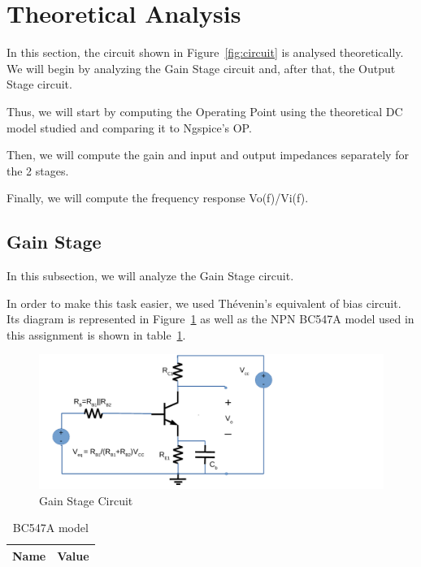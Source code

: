 \section{Theoretical Analysis}
\label{sec:analysis}
In this section, the circuit shown in Figure~\ref{fig:circuit} is analysed
theoretically. We will begin by analyzing the Gain Stage circuit and, after that, the Output Stage circuit.

Thus, we will start by computing the Operating Point using the theoretical DC
model studied and comparing it to Ngspice’s OP.

Then, we will compute the gain and input and output impedances separately for the 2 stages. 

Finally, we will compute the frequency response Vo(f)/Vi(f).

\subsection{Gain Stage}
In this subsection, we will analyze the Gain Stage circuit.

In order to make this task easier, we used Thévenin's equivalent of bias circuit. Its diagram is represented in Figure~\ref{fig:gscircuit} as well as the NPN BC547A model used in this assignment is shown in table~\ref{tab:bgs}.

\begin{figure}[H] \centering
\includegraphics[width=0.8\linewidth]{gainstage.pdf}
\caption{Gain Stage Circuit}                                     %
\label{fig:gscircuit}
\end{figure}


\begin{table}[H]
  \centering
  \begin{tabular}{|l|r|}
     \hline    
    {\bf Name} & {\bf Value} \\ \hline   
    
  \end{tabular}
  \caption{BC547A model}
  \label{tab:bgs}
\end{table}

